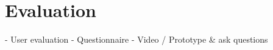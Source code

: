 
\chapter{Evaluation} \label{evaluation}

- User evaluation
- Questionnaire
- Video / Prototype & ask questions